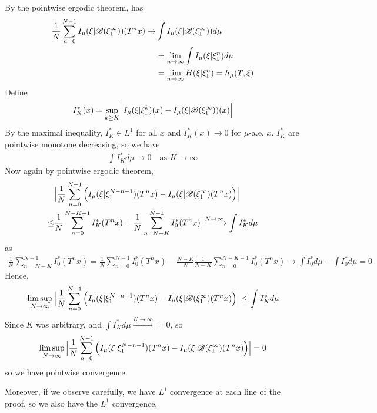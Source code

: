 \documentclass[10pt,a4paper]{report}
\newenvironment{proof}
{\begin{changemargin}{1cm}{0.5cm} 
	}%
	{\end{changemargin}
}
\begin{document}
\begin{proof}
\quad By the pointwise ergodic theorem, has
\begin{align*}
\frac{1}{N} \sum_{n=0}^{N-1} I_{\mu}( \xi | \mathscr{B}(\xi_1^{\infty}) ) (T^n x) \rightarrow & \int I_{\mu}(\xi | \mathscr{B}(\xi_1^{\infty})) d\mu \\
& = \lim_{n\rightarrow \infty} \int I_{\mu}(\xi | \xi_1^n) d\mu \\
& = \lim_{n\rightarrow \infty} H(\xi | \xi_1^n) = h_{\mu}(T, \xi)
\end{align*}
Define
\begin{align*}
I_K^* (x) = \sup_{k\geq K} \Big| I_{\mu}(\xi | \xi_1^k)(x) - I_{\mu}(\xi | \mathscr{B}(\xi_1^{\infty}))(x) \Big|
\end{align*}
By the maximal inequality, $I_K^* \in L^1$ for all $x$ and $I_K^*(x) \rightarrow 0$ for $\mu$-a.e. $x$. $I_K^*$ are pointwise monotone decreasing, so we have
\begin{align*}
\int I_K^* d\mu \rightarrow 0 \quad \text{as } K \rightarrow \infty
\end{align*}
Now again by pointwise ergodic theorem,
\begin{align*}
& \Big| \frac{1}{N} \sum_{n=0}^{N-1} \Big( I_{\mu}(\xi | \xi_1^{N-n-1})(T^n x) - I_{\mu}(\xi | \mathscr{B}(\xi_1^{\infty})(T^n x) \Big) \Big| \\
\leq & \frac{1}{N} \sum_{n=0}^{N-K-1} I_K^* (T^n x) + \frac{1}{N} \sum_{n=N-K}^{N-1} I_0^* (T^n x) \xrightarrow{N\rightarrow \infty} \int I_K^* d\mu
\end{align*}
as 
\begin{align*}
\frac{1}{N} \sum_{n=N-K}^{N-1} I_0^* (T^n x) = \frac{1}{N} \sum_{n=0}^{N-1}I_0^* (T^n x) - \frac{N-K}{N} \frac{1}{N-K} \sum_{n=0}^{N-K-1} I_0^*(T^n x) \rightarrow \int I_0^* d\mu -\int I_0^* d\mu =0
\end{align*}
Hence,
\begin{align*}
\limsup_{N\rightarrow \infty} \Big| \frac{1}{N} \sum_{n=0}^{N-1} \Big( I_{\mu}(\xi | \xi_1^{N-n-1})(T^n x) - I_{\mu}(\xi | \mathscr{B}(\xi_1^{\infty})(T^n x) \Big) \Big| \leq \int I_K^* d\mu
\end{align*}
Since $K$ was arbitrary, and $\int I_K^* d\mu \xrightarrow{K\rightarrow \infty} =0$, so 
\begin{align*}
\limsup_{N\rightarrow \infty} \Big| \frac{1}{N} \sum_{n=0}^{N-1} \Big( I_{\mu}(\xi | \xi_1^{N-n-1})(T^n x) - I_{\mu}(\xi | \mathscr{B}(\xi_1^{\infty})(T^n x) \Big) \Big| =0
\end{align*}
so we have pointwise convergence.

\quad Moreover, if we observe carefully, we have $L^1$ convergence at each line of the proof, so we also have the $L^1$ convergence.

\eop
\end{proof}
\end{document}
